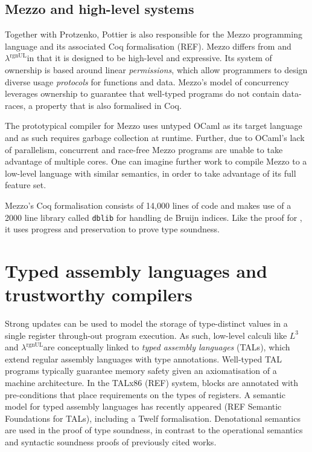 \documentclass[]{unswthesis}
\newcommand{\rgnUL}{$\lambda^\text{rgnUL}$\text{ }}
\newcommand{\SSPHS}{\text{SSPHS }}
\begin{document}
\subsection{Mezzo and high-level systems}

Together with Protzenko, Pottier is also responsible for the Mezzo programming language and its associated Coq formalisation (REF). Mezzo differs from \SSPHS and \rgnUL in that it is designed to be high-level and expressive. Its system of ownership is based around linear \textit{permissions}, which allow programmers to design diverse usage \textit{protocols} for functions and data. Mezzo's model of concurrency leverages ownership to guarantee that well-typed programs do not contain data-races, a property that is also formalised in Coq.

The prototypical compiler for Mezzo uses untyped OCaml as its target language and as such requires garbage collection at runtime. Further, due to OCaml's lack of parallelism, concurrent and race-free Mezzo programs are unable to take advantage of multiple cores. One can imagine further work to compile Mezzo to a low-level language with similar semantics, in order to take advantage of its full feature set.

Mezzo's Coq formalisation consists of 14,000 lines of code and makes use of a 2000 line library called \texttt{dblib} for handling de Bruijn indices. Like the proof for \SSPHS, it uses progress and preservation to prove type soundness.




\section{Typed assembly languages and trustworthy compilers}

Strong updates can be used to model the storage of type-distinct values in a single register through-out program execution. As such, low-level calculi like $L^3$ and \rgnUL are conceptually linked to \textit{typed assembly languages} (TALs), which extend regular assembly languages with type annotations. Well-typed TAL programs typically guarantee memory safety given an axiomatisation of a machine architecture. In the TALx86 (REF) system, blocks are annotated with pre-conditions that place requirements on the types of registers. A semantic model for typed assembly languages has recently appeared (REF Semantic Foundations for TALs), including a Twelf formalisation. Denotational semantics are used in the proof of type soundness, in contrast to the operational semantics and syntactic soundness proofs of previously cited works.
\end{document}

